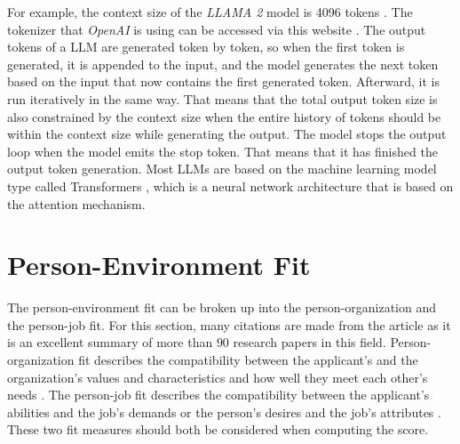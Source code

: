 \documentclass[draft,final]{thesisclass} %
\begin{document}
For example, the context size of the \textit{LLAMA 2} model is 4096 tokens \parencite[47]{llama2}.
The tokenizer that \textit{OpenAI} is using can be accessed via this website \textcite{openai_tokenizer}.
The output tokens of a \acs{LLM} are generated token by token, so when the first token is generated, it is appended to the input, and the model generates the next token based on the input that now contains the first generated token. Afterward, it is run iteratively in the same way.
That means that the total output token size is also constrained by the context size when the entire history of tokens should be within the context size while generating the output.
The model stops the output loop when the model emits the stop token. That means that it has finished the output token generation.
Most \acs{LLM}s are based on the machine learning model type called Transformers \parencite[1]{transformer}, which is a neural network architecture that is based on the attention mechanism.

\section{Person-Environment Fit}
The person-environment fit can be broken up into the person-organization and the person-job fit.
For this section, many citations are made from the article \textcite{po_and_pj_fit_literature_review} as it is an excellent summary of more than $90$ research papers in this field.
Person-organization fit describes the compatibility between the applicant's and the organization's values and characteristics and how well they meet each other's needs \parencite[179]{po_and_pj_fit_literature_review}.
The person-job fit describes the compatibility between the applicant's abilities and the job's demands or the person's desires and the job's attributes \parencite[179]{po_and_pj_fit_literature_review}.
These two fit measures should both be considered when computing the score.
\end{document}
